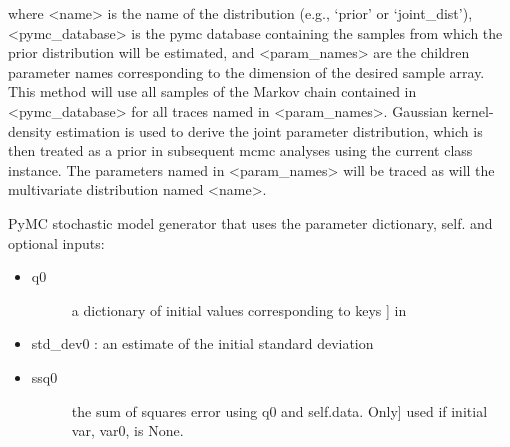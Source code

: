 \documentclass[letterpaper,10pt,english]{sphinxmanual}
\begin{document}
\begin{fulllineitems}
\begin{fulllineitems}
\begin{description}
where \textless{}name\textgreater{} is the name of the distribution (e.g., ‘prior’ or
‘joint\_dist’), \textless{}pymc\_database\textgreater{} is the pymc database containing the
samples from which the prior distribution will be estimated, and
\textless{}param\_names\textgreater{} are the children parameter names corresponding to the
dimension of the desired sample array. This method will use all
samples of the Markov chain contained in \textless{}pymc\_database\textgreater{} for all
traces named in \textless{}param\_names\textgreater{}. Gaussian kernel-density estimation
is used to derive the joint parameter distribution, which is then
treated as a prior in subsequent mcmc analyses using the current
class instance. The parameters named in \textless{}param\_names\textgreater{} will be
traced as will the multivariate distribution named \textless{}name\textgreater{}.

\end{description}

\end{fulllineitems}


\begin{fulllineitems}
\label{\detokenize{source_code:smcpy.mcmc.mcmc_sampler.MCMCSampler.generate_pymc_model}}
PyMC stochastic model generator that uses the parameter dictionary,
self. and optional inputs:
\begin{itemize}
\item {} \begin{description}
\item[{q0}] \leavevmode{[}a dictionary of initial values corresponding to keys {]}
in

\end{description}

\item {} 
std\_dev0  : an estimate of the initial standard deviation

\item {} \begin{description}
\item[{ssq0}] \leavevmode{[}the sum of squares error using q0 and self.data. Only{]}
used if initial var, var0, is None.


\end{description}
\end{itemize}
\end{fulllineitems}
\end{fulllineitems}
\end{document}
